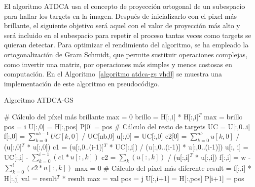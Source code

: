 El algoritmo ATDCA usa el concepto de proyección ortogonal de un subespacio para hallar los targets en la imagen. Después de inicializarlo con el pixel más brillante, el siguiente objetivo será aquel con el valor de proyección más alto y será incluido en el subespacio para repetir el proceso tantas veces como targets se quieran detectar. Para optimizar el rendimiento del algoritmo, se ha empleado la ortogonalización de Gram Schmidt, que permite sustituir operaciones complejas, como invertir una matriz, por operaciones más simples y menos costosas en computación. En el Algoritmo~\ref{algoritmo atdca-gs vhdl} se muestra una implementación de este algoritmo en pseudocódigo.

\begin{algorithm}\small
\caption{Algoritmo ATDCA-GS}
\begin{algorithmic}[1]
\label{algoritmo atdca-gs vhdl}
\STATE \# Cálculo del píxel más brillante
\STATE max = 0
    \STATE brillo = H[:,i] * H[:,i]$^{T}$
        \STATE max = brillo
        \STATE pos = i
    \ENDIF
\ENDFOR
\STATE U[:,0] = H[:,pos]
\STATE P[0] = pos
\STATE
\STATE \# Cálculo del resto de targets
    \STATE UC = U[:,0..i]
        \STATE f[:,0] = $\sum_{k=0}^{nb-1}UC[k,0]$ / UC[nb,0]
        \STATE u[:,0] = UC[:,0]
        \STATE c2[0] = $\sum_{k=0}^{nb}u[k,0]$ / (u[:,0]$^{T}$ * u[:,0])
    \ELSE
        \STATE c1 = (u[:,0..(i-1)]$^{T}$ * UC[:,i]) / (u[:,0..(i-1)] * u[:,0..(i-1)])
        \STATE u[:, i] = UC[:,i] - $\sum_{k=0}^{i-1}(c1 * u[:,k])$
        \STATE c2 = $\sum_{k}(u[:,k])$ / (u[:,i]$^{T}$ * u[:,i])
        \STATE f[:,i] = w - $\sum_{k=0}^{i}(c2 * u[:,k])$
    \ENDIF
    \STATE
    \STATE max = 0
    \STATE \# Cálculo del píxel más diferente
        \STATE result = f[:,i] * H[:,j]
        \STATE val = result$^{T}$ * result
            \STATE max = val
            \STATE pos = j
        \ENDIF
    \ENDFOR
    \STATE U[:,i+1] = H[:,pos]
    \STATE P[i+1] = pos
\ENDFOR
\end{algorithmic}
\end{algorithm}

